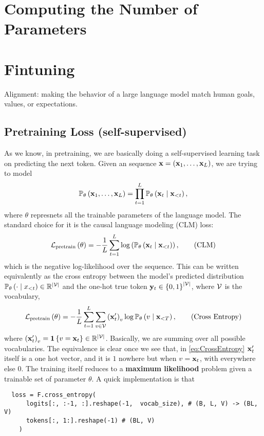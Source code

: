 \documentclass[11pt]{article}  %
\begin{document}
\section{Computing the Number of Parameters}


\section{Fintuning}
Alignment: making the behavior of a large language model match human goals, values, or expectations.


\subsection{Pretraining Loss (self-supervised)}
As we know, in pretraining, we are basically doing a self-supervised learning task on predicting the next token.
Given an sequence $\mathbf{x} = (\mathbf{x}_1, \hdots, \mathbf{x}_L)$, we are trying to model 
\begin{align*}
  \mathbb{P}_{\theta}\left( \mathbf{x}_1, \hdots, \mathbf{x}_L \right) = \prod_{t=1}^L \mathbb{P}_{\theta}\left( \mathbf{x}_t \mid \mathbf{x}_{< t} \right),
\end{align*}
where $\theta$ represnets all the trainable parameters of the language model. 
The standard choice for it is the causal language modeling (CLM) loss:
\begin{align}
  \label{eq:CLM}
  \mathcal{L}_{\text{pretrain}} \left( \theta \right) = -\frac{1}{L}\sum_{t=1}^{L}\log\left( \mathbb{P}_{\theta}\left( \mathbf{x}_t \mid \mathbf{x}_{<t} \right) \right), \tag{CLM}
\end{align}
which is the negative log-likelihood over the sequence.
This can be written equivalently as the cross entropy between the model's predicted distribution $\mathbb{P}_{\theta}\left( \cdot \mid x_{< t} \right) \in \mathbb{R}^{\lvert\mathcal{V} \rvert}$ and the one-hot true token $\mathbf{y}_t \in \left\{ 0, 1 \right\}^{\lvert\mathcal{V} \rvert}$, where $\mathcal{V}$ is the vocabulary,
\begin{align}
  \label{eq:CrossEntropy}
  \mathcal{L}_{\text{pretrain}}\left( \theta \right) = -\frac{1}{L}\sum_{t=1}^{L}\sum_{v \in \mathcal{V}} \left( \mathbf{x}^\prime_{t} \right)_v \log \mathbb{P}_{\theta}\left( v \mid \mathbf{x}_{<T} \right), \tag{Cross Entropy}
\end{align} 
where $\left( \mathbf{x}^\prime_t \right)_v = \mathbf{1}\left\{ v = \mathbf{x}_t \right\} \in \mathbb{R}^{\lvert\mathcal{V}\rvert}$.
Basically, we are summing over all possible vocabularies.
The equivalence is clear once we see that, in \eqref{eq:CrossEntropy} $\mathbf{x}^\prime_t$ itself is a one hot vector, and it is $1$ nowhere but when $v = \mathbf{x}_t$, with everywhere else $0$.
The training itself reduces to a \textbf{maximum likelihood} problem given a trainable set of parameter $\theta$.  
A quick implementation is that 
\begin{verbatim}
  loss = F.cross_entropy(
      logits[:, :-1, :].reshape(-1,  vocab_size), # (B, L, V) -> (BL, V)
      tokens[:, 1:].reshape(-1) # (BL, V)
    )
\end{verbatim}
\end{document}
